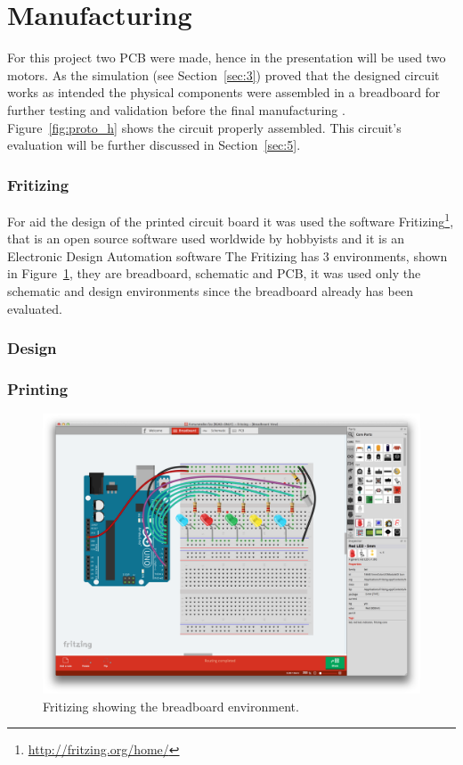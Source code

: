 \section{\textbf{Manufacturing}}\label{sec:4}
    For this project two PCB were made, hence in the presentation will be used two motors.
    As the simulation (see Section~\ref{sec:3}) proved that the designed circuit works as intended the physical components were assembled in a breadboard for further testing and validation before the final manufacturing . Figure~\ref{fig:proto_h} shows the circuit properly assembled. This circuit's evaluation will be further discussed in Section~\ref{sec:5}.

    \subsubsection{Fritizing} %
    \label{ssub:fritizing}
        For aid the design of the printed circuit board it was used the software Fritizing\footnote{\url{http://fritzing.org/home/}}, that is an open source software used worldwide by hobbyists and it is an Electronic Design Automation software
        The Fritizing has 3 environments, shown in Figure~\ref{fig:breadboard}, they are breadboard, schematic and PCB, it was used only the schematic and design environments since the breadboard already has been evaluated.

    \subsubsection{Design} %
    \label{ssub:printing}


    \subsubsection{Printing} %
    \label{ssub:printing}
    
	
\begin{figure}[t]
\centering
\centering%
\includegraphics[height=.40\textwidth]{img/FritzingBreadBoard.png}
\caption{Fritizing showing the breadboard environment.}
\label{fig:breadboard}%
\end{figure}


